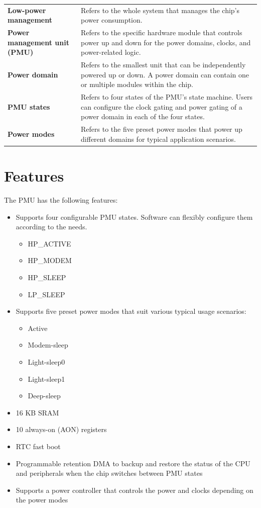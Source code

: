 \documentclass[main\_\_EN.tex]{subfiles}
\begin{document}
\begin{longtable}[c]{ R{6cm} p{10cm} }
\textbf{Low-power management} & Refers to the whole system that manages the chip's power consumption. \\
\textbf{Power management unit (PMU)} & Refers to the specific hardware module that controls power up and down for the power domains, clocks, and power-related logic. \\
\textbf{Power domain} & Refers to the smallest unit that can be independently powered up or down. A power domain can contain one or multiple modules within the chip. \\
\textbf{PMU states} & Refers to four states of the PMU's state machine. Users can configure the clock gating and power gating of a power domain in each of the four states.\\
\textbf{Power modes} & Refers to the five preset power modes that power up different domains for typical application scenarios.\\
\end{longtable}

\section{Features}

The PMU has the following features:

\begin{itemize}
    \item Supports four configurable PMU states. Software can flexibly configure them according to the needs.
        \begin{itemize}
        \item HP\_ACTIVE
        \item HP\_MODEM
        \item HP\_SLEEP
        \item LP\_SLEEP
        \end{itemize}
    \item Supports five preset power modes that suit various typical usage scenarios:
    \begin{itemize}
        \item Active
        \item Modem-sleep
        \item Light-sleep0
        \item Light-sleep1
        \item Deep-sleep
    \end{itemize}
    \item 16 KB SRAM
    \item 10 always-on (AON) registers
    \item RTC fast boot
    \item Programmable retention DMA to backup and restore the status of the CPU and peripherals when the chip switches between PMU states
    \item Supports a power controller that controls the power and clocks depending on the power modes
\end{itemize}
\end{document}
